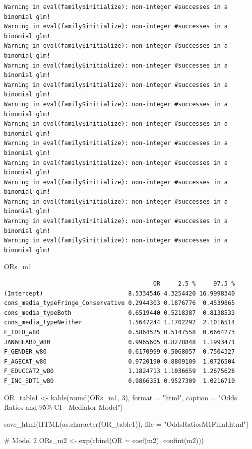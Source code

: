 \documentclass[
  letterpaper,
  DIV=11,
  numbers=noendperiod]{scrartcl}
\newenvironment{Shaded}{\begin{snugshade}}{\end{snugshade}}
\newcommand{\AttributeTok}[1]{\textcolor[rgb]{0.40,0.45,0.13}{#1}}
\newcommand{\CommentTok}[1]{\textcolor[rgb]{0.37,0.37,0.37}{#1}}
\newcommand{\DecValTok}[1]{\textcolor[rgb]{0.68,0.00,0.00}{#1}}
\newcommand{\FunctionTok}[1]{\textcolor[rgb]{0.28,0.35,0.67}{#1}}
\newcommand{\NormalTok}[1]{\textcolor[rgb]{0.00,0.23,0.31}{#1}}
\newcommand{\OtherTok}[1]{\textcolor[rgb]{0.00,0.23,0.31}{#1}}
\newcommand{\StringTok}[1]{\textcolor[rgb]{0.13,0.47,0.30}{#1}}
\begin{document}
\begin{verbatim}
Warning in eval(family$initialize): non-integer #successes in a binomial glm!
Warning in eval(family$initialize): non-integer #successes in a binomial glm!
Warning in eval(family$initialize): non-integer #successes in a binomial glm!
Warning in eval(family$initialize): non-integer #successes in a binomial glm!
Warning in eval(family$initialize): non-integer #successes in a binomial glm!
Warning in eval(family$initialize): non-integer #successes in a binomial glm!
Warning in eval(family$initialize): non-integer #successes in a binomial glm!
Warning in eval(family$initialize): non-integer #successes in a binomial glm!
Warning in eval(family$initialize): non-integer #successes in a binomial glm!
Warning in eval(family$initialize): non-integer #successes in a binomial glm!
Warning in eval(family$initialize): non-integer #successes in a binomial glm!
Warning in eval(family$initialize): non-integer #successes in a binomial glm!
Warning in eval(family$initialize): non-integer #successes in a binomial glm!
\end{verbatim}

\begin{Shaded}
\begin{Highlighting}[]
\NormalTok{ORs\_m1}
\end{Highlighting}
\end{Shaded}

\begin{verbatim}
                                          OR     2.5 %     97.5 %
(Intercept)                        8.5334546 4.3254420 16.9998340
cons_media_typeFringe_Conservative 0.2944303 0.1876776  0.4539865
cons_media_typeBoth                0.6519440 0.5218387  0.8138533
cons_media_typeNeither             1.5647244 1.1702292  2.1016514
F_IDEO_w80                         0.5864525 0.5147558  0.6664273
JAN6HEARD_W80                      0.9965605 0.8278848  1.1993471
F_GENDER_w80                       0.6170999 0.5068057  0.7504327
F_AGECAT_w80                       0.9720190 0.8809109  1.0726504
F_EDUCCAT2_w80                     1.1824713 1.1036659  1.2675628
F_INC_SDT1_w80                     0.9866351 0.9527309  1.0216710
\end{verbatim}

\begin{Shaded}
\begin{Highlighting}[]
\NormalTok{OR\_table1 }\OtherTok{\textless{}{-}} \FunctionTok{kable}\NormalTok{(}\FunctionTok{round}\NormalTok{(ORs\_m1, }\DecValTok{3}\NormalTok{), }\AttributeTok{format =} \StringTok{"html"}\NormalTok{, }\AttributeTok{caption =} \StringTok{"Odds Ratios and 95\% CI {-} Mediator Model"}\NormalTok{)}

\FunctionTok{save\_html}\NormalTok{(}\FunctionTok{HTML}\NormalTok{(}\FunctionTok{as.character}\NormalTok{(OR\_table1)), }\AttributeTok{file =} \StringTok{"OddsRatiosM1Final.html"}\NormalTok{)}

\CommentTok{\# Model 2}
\NormalTok{ORs\_m2 }\OtherTok{\textless{}{-}} \FunctionTok{exp}\NormalTok{(}\FunctionTok{cbind}\NormalTok{(}\AttributeTok{OR =} \FunctionTok{coef}\NormalTok{(m2), }\FunctionTok{confint}\NormalTok{(m2)))}
\end{Highlighting}
\end{Shaded}
\end{document}

